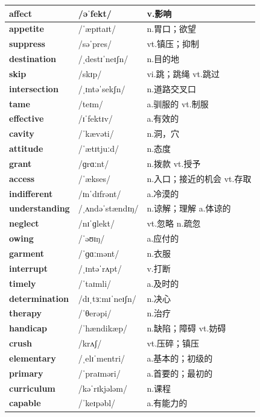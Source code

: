 \documentclass[14pt,a4paper]{extarticle}
\begin{document}
\begin{longtable}{ p{} p{} p{} }
\textbf{affect} & /əˈfekt/ & v.影响 \\ \hline
\textbf{appetite} & /ˈæpɪtaɪt/ & n.胃口；欲望 \\ \hline
\textbf{suppress} & /səˈpres/ & vt.镇压；抑制 \\ \hline
\textbf{destination} & /ˌdestɪˈneɪʃn/ & n.目的地 \\ \hline
\textbf{skip} & /skɪp/ & vi.跳；跳绳 \quad vt.跳过 \\ \hline
\textbf{intersection} & /ˌɪntəˈsekʃn/ & n.道路交叉口 \\ \hline
\textbf{tame} & /teɪm/ & a.驯服的 \quad vt.制服 \\ \hline
\textbf{effective} & /ɪˈfektɪv/ & a.有效的 \\ \hline
\textbf{cavity} & /ˈkævəti/ & n.洞，穴 \\ \hline
\textbf{attitude} & /ˈætɪtjuːd/ & n.态度 \\ \hline
\textbf{grant} & /ɡrɑːnt/ & n.拨款 \quad vt.授予 \\ \hline
\textbf{access} & /ˈækses/ & n.入口；接近的机会 \quad vt.存取 \\ \hline
\textbf{indifferent} & /ɪnˈdɪfrənt/ & a.冷漠的 \\ \hline
\textbf{understanding} & /ˌʌndəˈstændɪŋ/ & n.谅解；理解 \quad a.体谅的 \\ \hline
\textbf{neglect} & /nɪˈɡlekt/ & vt.忽略 \quad n.疏忽 \\ \hline
\textbf{owing} & /ˈəʊɪŋ/ & a.应付的 \\ \hline
\textbf{garment} & /ˈɡɑːmənt/ & n.衣服 \\ \hline
\textbf{interrupt} & /ˌɪntəˈrʌpt/ & v.打断 \\ \hline
\textbf{timely} & /ˈtaɪmli/ & a.及时的 \\ \hline
\textbf{determination} & /dɪˌtɜːmɪˈneɪʃn/ & n.决心 \\ \hline
\textbf{therapy} & /ˈθerəpi/ & n.治疗 \\ \hline
\textbf{handicap} & /ˈhændikæp/ & n.缺陷；障碍 \quad vt.妨碍 \\ \hline
\textbf{crush} & /krʌʃ/ & vt.压碎；镇压 \\ \hline
\textbf{elementary} & /ˌelɪˈmentri/ & a.基本的；初级的 \\ \hline
\textbf{primary} & /ˈpraɪməri/ & a.首要的；最初的 \\ \hline
\textbf{curriculum} & /kəˈrɪkjələm/ & n.课程 \\ \hline
\textbf{capable} & /ˈkeɪpəbl/ & a.有能力的 \\ \hline

\end{longtable}
\end{document}
